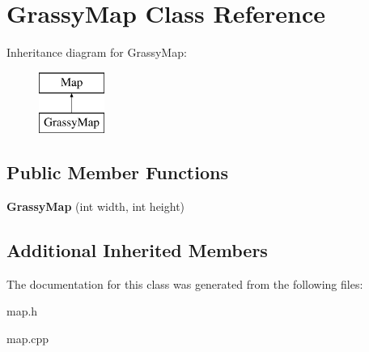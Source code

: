 \hypertarget{classGrassyMap}{}\section{Grassy\+Map Class Reference}
\label{classGrassyMap}
Inheritance diagram for Grassy\+Map\+:\begin{figure}[H]
\begin{center}
\leavevmode
\includegraphics[height=2.000000cm]{classGrassyMap}
\end{center}
\end{figure}
\subsection*{Public Member Functions}
\begin{DoxyCompactItemize}
\item 
\mbox{\label{classGrassyMap_ab150f8fa0936231b70c5546b43c5075a}} 
{\bfseries Grassy\+Map} (int width, int height)
\end{DoxyCompactItemize}
\subsection*{Additional Inherited Members}


The documentation for this class was generated from the following files\+:\begin{DoxyCompactItemize}
\item 
map.\+h\item 
map.\+cpp\end{DoxyCompactItemize}
